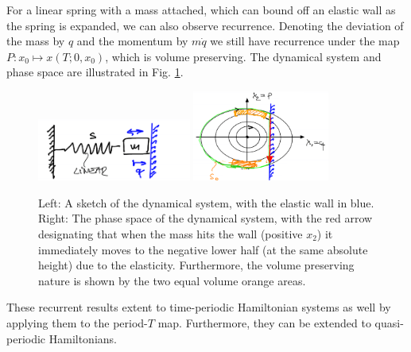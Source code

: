 \begin{ex}
	For a linear spring with a mass attached, which can bound off an elastic wall as the spring is expanded, we can also observe recurrence. Denoting the deviation of the mass by $q$ and the momentum by $m\dot{q}$ we still have recurrence under the map $P:x_0 \mapsto x(T;0, x_0)$, which is volume preserving. The dynamical system and phase space are illustrated in Fig. \ref{fig:bouncy_wall_spring}.
	 \begin{figure}[h!]
		\centering
		\includegraphics[width=0.45\textwidth]{figures/ch8/13bouncy_wall_spring_A.png}
		\includegraphics[width=0.4\textwidth]{figures/ch8/13bouncy_wall_spring_B.png}
		\caption{Left: A sketch of the dynamical system, with the elastic wall in blue. Right: The phase space of the dynamical system, with the red arrow designating that when the mass hits the wall (positive $x_2$) it immediately moves to the negative lower half (at the same absolute height) due to the elasticity. Furthermore, the volume preserving nature is shown by the two equal volume orange areas.}
		\label{fig:bouncy_wall_spring}
	\end{figure}

	\begin{remark}[]
		These recurrent results extent to time-periodic Hamiltonian systems as well by applying them to the period-$T$ map. Furthermore, they can be extended to quasi-periodic Hamiltonians.
	\end{remark}
	
\end{ex}

